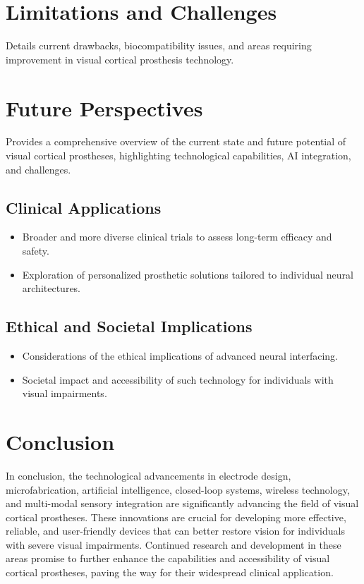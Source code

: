 \documentclass[twocolumn,10pt]{article}
\begin{document}

\section{Limitations and Challenges}\label{sec:limitations}
Details current drawbacks, biocompatibility issues, and areas requiring
improvement in visual cortical prosthesis technology.

\section{Future Perspectives}\label{sec:future}
Provides a comprehensive overview of the current state and future potential of
visual cortical prostheses, highlighting technological capabilities, AI
integration, and challenges.

\subsection{Clinical Applications}
\begin{itemize}
      \item Broader and more diverse clinical trials to assess long-term efficacy
            and safety.
      \item Exploration of personalized prosthetic solutions tailored to
            individual neural architectures.
\end{itemize}

\subsection{Ethical and Societal Implications}
\begin{itemize}
      \item Considerations of the ethical implications of advanced neural
            interfacing.
      \item Societal impact and accessibility of such technology for individuals
            with visual impairments.
\end{itemize}

\section{Conclusion}\label{sec:conclusion}
In conclusion, the technological advancements in electrode design,
microfabrication, artificial intelligence, closed-loop systems, wireless
technology, and multi-modal sensory integration are significantly advancing the
field of visual cortical prostheses. These innovations are crucial for
developing more effective, reliable, and user-friendly devices that can better
restore vision for individuals with severe visual impairments. Continued
research and development in these areas promise to further enhance the
capabilities and accessibility of visual cortical prostheses, paving the way for
their widespread clinical application.

\printbibliography%
\end{document}
